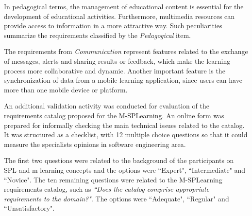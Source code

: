In pedagogical terms, the management of educational content is essential for the development of educational activities. Furthermore, multimedia resources can provide access to information in a more attractive way. Such peculiarities summarize the requirements classified by the \textit{Pedagogical} item.

The requirements from \textit{Communication} represent features related to the exchange of messages, alerts and sharing results or feedback, which make the learning process more collaborative and dynamic. Another important feature is the synchronization of data from a mobile learning application, since users can have more than one mobile device or platform.

An additional validation activity was conducted for evaluation of the requirements catalog proposed for the M-SPLearning. An online form was prepared for informally checking the main technical issues related to the catalog. It was structured as a checklist, with 12 multiple choice questions so that it could measure the specialists opinions in software engineering area.

The first two questions were related to the background of the participants on SPL and m-learning concepts and the options were ``Expert", ``Intermediate" and ``Novice". The ten remaining questions were related to the M-SPLearning requirements catalog, such as \textit{``Does the catalog comprise appropriate requirements to the domain?"}. The options were ``Adequate", ``Regular" and ``Unsatisfactory".

